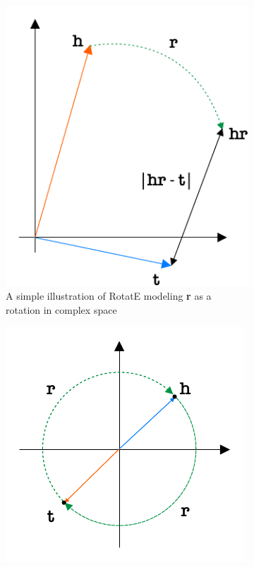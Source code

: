 \begin{enumerate}
\begin{figure}[t]
    \centering
    \begin{subfigure}[t]{0.45\textwidth}
        \centering
        \includegraphics[width=\textwidth]{figures/rotate_illustration_1.pdf}
        \caption{A simple illustration of RotatE modeling \textbf{r} as a rotation in complex space}
        \label{fig:rotatE-illustration-1}
    \end{subfigure}
    \hfill
    \begin{subfigure}[t]{0.45\textwidth}
        \centering
        \includegraphics[width=\textwidth]{figures/rotate_illustration_2.pdf}

\end{subfigure}
\end{figure}
\end{enumerate}
